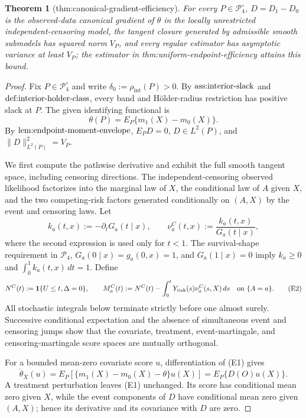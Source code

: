 \documentclass{article}
\newtheorem{theorem}{Theorem}
\begin{document}
\begin{theorem}[thm:canonical-gradient-efficiency]\label{thm:canonical-gradient-efficiency}
For every \(P\in\mathcal P_4^{\circ}\), \(D=D_1-D_0\) is the observed-data canonical gradient of \(\theta\) in the locally unrestricted independent-censoring model, the tangent closure generated by admissible smooth submodels has squared norm \(V_P\), and every regular estimator has asymptotic variance at least \(V_P\); the estimator in thm:uniform-endpoint-efficiency attains this bound.
\end{theorem}
\begin{proof}
Fix \(P\in\mathcal P_4^{\circ}\) and write \(\delta_0:=\rho_{\mathrm{int}}(P)>0\).  By \(\textnormal{ass:interior-slack}\) and \(\textnormal{def:interior-holder-class}\), every band and H\"older-radius restriction has positive slack at \(P\).  The given identifying functional is
\[
 \theta(P)=E_P\{m_1(X)-m_0(X)\}.                                      \tag{E1}
\]
By \(\textnormal{lem:endpoint-moment-envelope}\), \(E_PD=0\), \(D\in L^2(P)\), and \(\lVert D\rVert_{L^2(P)}^2=V_P\).

We first compute the pathwise derivative and exhibit the full smooth tangent space, including censoring directions.  The independent-censoring observed likelihood factorizes into the marginal law of \(X\), the conditional law of \(A\) given \(X\), and the two competing-risk factors generated conditionally on \((A,X)\) by the event and censoring laws.  Let
\[
 k_a(t,x):=-\partial_tG_a(t\mid x),\qquad
 \nu_a^C(t,x):=\frac{k_a(t,x)}{G_a(t\mid x)},
\]
where the second expression is used only for \(t<1\).  The survival-shape requirement in \(\mathcal P_4\), \(G_a(0\mid x)=g_a(0,x)=1\), and \(G_a(1\mid x)=0\) imply \(k_a\ge0\) and \(\int_0^1k_a(t,x)\,dt=1\).  Define
\[
 N^C(t):=\mathbf 1\{U\le t,\Delta=0\},\qquad
 M_a^C(t):=N^C(t)-\int_0^tY_{\mathrm{risk}}(s)\nu_a^C(s,X)\,ds
 \quad\hbox{on }\{A=a\}.                                             \tag{E2}
\]
All stochastic integrals below terminate strictly before one almost surely.  Successive conditional expectation and the absence of simultaneous event and censoring jumps show that the covariate, treatment, event-martingale, and censoring-martingale score spaces are mutually orthogonal.

For a bounded mean-zero covariate score \(u\), differentiation of (E1) gives
\[
 \dot\theta_X(u)=E_P[\{m_1(X)-m_0(X)-\theta\}u(X)]
                 =E_P\{D(O)u(X)\}.                                   \tag{E3}
\]
A treatment perturbation leaves (E1) unchanged.  Its score has conditional mean zero given \(X\), while the event components of \(D\) have conditional mean zero given \((A,X)\); hence its derivative and its covariance with \(D\) are zero.


\end{proof}
\end{document}
